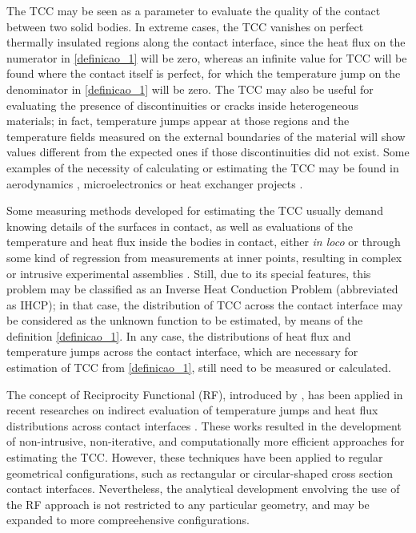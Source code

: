 \documentclass[12pt]{CHT-20}
\begin{document}
The TCC may be seen as a parameter to evaluate the quality of the contact between two solid bodies. In extreme cases, the TCC vanishes on perfect thermally insulated regions along the contact interface, since the heat flux on the numerator in \eqref{definicao_1} will be zero, whereas an infinite value for TCC will be found where the contact itself is perfect, for which the temperature jump on the denominator in \eqref{definicao_1} will be zero. The TCC may also be useful for evaluating the presence of discontinuities or cracks inside heterogeneous materials; in fact, temperature jumps appear at those regions and the temperature fields measured on the external boundaries of the material will show values different from the expected ones if those discontinuities did not exist. Some examples of the necessity of calculating or estimating the TCC may be found in aerodynamics \citep{artigo_aerospacial}, microelectronics \citep{artigo_snaith} or heat exchanger projects \citep{artigo_huang}. 

Some measuring methods developed for estimating the TCC usually demand knowing details of the surfaces in contact, as well as evaluations of the temperature and heat flux inside the bodies in contact, either \textit{in loco} or through some kind of regression from measurements at inner points, resulting in complex or intrusive experimental assemblies \citep{artigo_fenech, tese_mikic, artigo_beck, artigo_salgon}. Still, due to its special features, this problem may be classified as an Inverse Heat Conduction Problem (abbreviated as IHCP); in that case, the distribution of TCC across the contact interface may be considered as the unknown function to be estimated, by means of the definition \eqref{definicao_1}. In any case, the distributions of heat flux and temperature jumps across the contact interface, which are necessary for estimation of TCC from \eqref{definicao_1}, still need to be measured or calculated.

The concept of Reciprocity Functional (RF), introduced by \cite{artigo_andrieux}, has been applied in recent researches on indirect evaluation of temperature jumps and heat flux distributions across contact interfaces \citep{reciproc_3, artigo_colaco_2, artigo_colaco_3, artigo_abreu_2,artigo_abreu_3, artigo_padilha_2}. These works resulted in the development of non-intrusive, non-iterative, and computationally more efficient approaches for estimating the TCC. However, these techniques have been applied to regular geometrical configurations, such as rectangular or circular-shaped cross section contact interfaces. Nevertheless, the analytical development envolving the use of the RF approach is not restricted to any particular geometry, and may be expanded to more compreehensive configurations.
\end{document}
